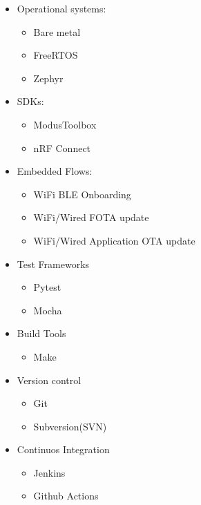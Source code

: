 \begin{itemize}
    \item Operational systems:
    \begin{itemize}
        \item Bare metal
        \item FreeRTOS
        \item Zephyr
    \end{itemize}

    \item SDKs:
    \begin{itemize}
        \item ModusToolbox
        \item nRF Connect
    \end{itemize}

    \item Embedded Flows:
    \begin{itemize}
        \item WiFi BLE Onboarding
        \item WiFi/Wired FOTA update
        \item WiFi/Wired Application OTA update
    \end{itemize}

    \item Test Frameworks
    \begin{itemize}
        \item Pytest
        \item Mocha
    \end{itemize}

    \item Build Tools
    \begin{itemize}
        \item Make
    \end{itemize}

    \item Version control
    \begin{itemize}
        \item Git
        \item Subversion(SVN)
    \end{itemize}

    \item Continuos Integration
    \begin{itemize}
        \item Jenkins
        \item Github Actions
    \end{itemize}


\end{itemize}
